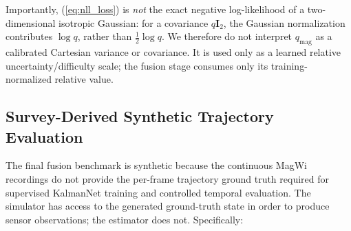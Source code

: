 \documentclass[conference]{IEEEtran}
\begin{document}
Importantly, (\ref{eq:nll_loss}) is \emph{not} the exact negative log-likelihood of a two-dimensional isotropic Gaussian: for a covariance $q\mathbf{I}_2$, the Gaussian normalization contributes $\log q$, rather than $\tfrac{1}{2}\log q$. We therefore do not interpret $q_{\mathrm{mag}}$ as a calibrated Cartesian variance or covariance. It is used only as a learned relative uncertainty/difficulty scale; the fusion stage consumes only its training-normalized relative value.

\subsection{Survey-Derived Synthetic Trajectory Evaluation}

The final fusion benchmark is synthetic because the continuous MagWi recordings do not provide the per-frame trajectory ground truth required for supervised KalmanNet training and controlled temporal evaluation. The simulator has access to the generated ground-truth state in order to produce sensor observations; the estimator does not. Specifically:
\end{document}
